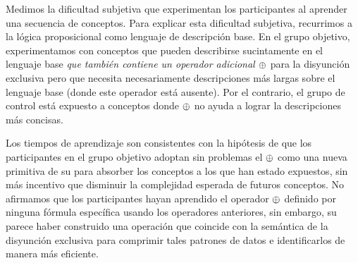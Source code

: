 Medimos la dificultad subjetiva que experimentan los participantes al aprender una secuencia de conceptos. Para explicar esta dificultad subjetiva, recurrimos a la lógica proposicional como lenguaje de descripción base. En el grupo objetivo, experimentamos con conceptos que pueden describirse sucintamente en el lenguaje base {\em que también contiene un operador adicional $ \oplus $} para la disyunción exclusiva pero que necesita necesariamente descripciones más largas sobre el lenguaje base (donde este operador está ausente). Por el contrario, el grupo de control está expuesto a conceptos donde $ \oplus $ no ayuda a lograr la descripciones más concisas.

Los tiempos de aprendizaje son consistentes con la hipótesis de que los participantes en el grupo objetivo adoptan sin problemas el $ \oplus $ como una nueva primitiva de su \lot para absorber los conceptos a los que han estado expuestos, sin más incentivo que disminuir la complejidad esperada de futuros conceptos. No afirmamos que los participantes hayan aprendido el operador $ \oplus $ definido por ninguna fórmula específica usando los operadores anteriores, sin embargo, su \lot parece haber construido una operación que coincide con la semántica de la disyunción exclusiva para comprimir tales patrones de datos e identificarlos de manera más eficiente.

